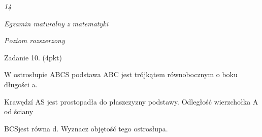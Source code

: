 \documentclass[a4paper,12pt]{article}
\begin{document}
{\it 14}

{\it Egzamin maturalny z matematyki}

{\it Poziom rozszerzony}

Zadanie 10. (4pkt)

W ostrosłupie ABCS podstawa ABC jest trójkątem równobocznym o boku długości a.

Krawędzí AS jest prostopadła do płaszczyzny podstawy. Odległość wierzchołka A od ściany

BCSjest równa d. Wyznacz objętość tego ostrosłupa.
\end{document}
